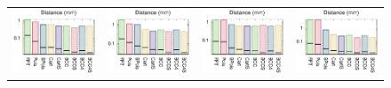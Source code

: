 \begin{figure} 
	\centering
	\begin{tabular}{c c c c}
	\includegraphics[width=0.23\linewidth]{figures/anchor/_dist.eps} &
	\includegraphics[width=0.23\linewidth]{figures/daratech/_dist.eps} &
	\includegraphics[width=0.23\linewidth]{figures/dc/_dist.eps} &
	\includegraphics[width=0.23\linewidth]{figures/quasimoto/_dist.eps} \\


\end{tabular}
\end{figure}
